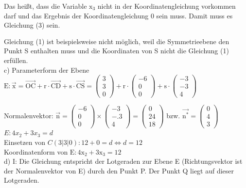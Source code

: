 \documentclass[10pt]{article}
\begin{document}
Das heißt, dass die Variable $\mathrm{x}_{3}$ nicht in der Koordinatengleichung vorkommen darf und das Ergebnis der Koordinatengleichung 0 sein muss. Damit muss es Gleichung (3) sein.

Gleichung (1) ist beispielsweise nicht möglich, weil die Symmetrieebene den Punkt S enthalten muss und die Koordinaten von S nicht die Gleichung (1) erfüllen.\\
c) Parameterform der Ebene $\mathrm{E}: \overrightarrow{\mathrm{x}}=\overrightarrow{\mathrm{OC}}+\mathrm{r} \cdot \overrightarrow{\mathrm{CD}}+\mathrm{s} \cdot \overrightarrow{\mathrm{CS}}=\left(\begin{array}{l}3 \\ 3 \\ 0\end{array}\right)+\mathrm{r} \cdot\left(\begin{array}{c}-6 \\ 0 \\ 0\end{array}\right)+\mathrm{s} \cdot\left(\begin{array}{c}-3 \\ -3 \\ 4\end{array}\right)$

Normalenvektor: $\overrightarrow{\mathrm{n}}=\left(\begin{array}{c}-6 \\ 0 \\ 0\end{array}\right) \times\left(\begin{array}{c}-3 \\ -.3 \\ 4\end{array}\right)=\left(\begin{array}{c}0 \\ 24 \\ 18\end{array}\right)$ bzw. $\overrightarrow{\mathrm{n}^{*}}=\left(\begin{array}{l}0 \\ 4 \\ 3\end{array}\right)$\\
$E: 4 x_{2}+3 x_{3}=d$\\
Einsetzen von $C(3|3| 0): 12+0=d \Leftrightarrow d=12$\\
Koordinatenform von $\mathrm{E}: 4 \mathrm{x}_{2}+3 \mathrm{x}_{3}=12$\\
d) I: Die Gleichung entspricht der Lotgeraden zur Ebene E (Richtungsvektor ist der Normalenvektor von E) durch den Punkt P. Der Punkt Q liegt auf dieser Lotgeraden.
\end{document}
